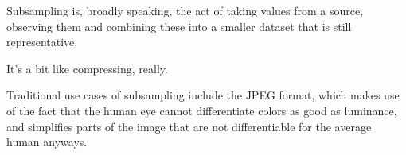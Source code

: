 Subsampling is, broadly speaking, the act of taking values from a source, observing them and combining these into a smaller dataset that is still representative.  

It's a bit like compressing, really.  

Traditional use cases of subsampling include the JPEG format, which makes use of the fact that the human eye cannot differentiate colors as good as luminance, and simplifies parts of the image that are not differentiable for the average human anyways. \cite{BrandenLambrecht2001}